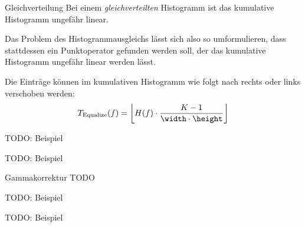 \begin{example}{Gleichverteilung}
    Bei einem \emph{gleichverteilten} Histogramm ist das kumulative Histogramm ungefähr linear.

    Das Problem des Histogrammausgleichs lässt sich also so umformulieren, dass stattdessen ein Punktoperator gefunden werden soll, der das kumulative Histogramm ungefähr linear werden lässt.

    Die Einträge können im kumulativen Histogramm wie folgt nach rechts oder links verschoben werden:
    \[
        T_{\text{Equalize}}(f) = \left\lfloor H(f) \cdot \frac{K - 1}{\width \cdot \height} \right\rfloor
    \]

    TODO: Beispiel

    TODO: Beispiel
\end{example}

\begin{defi}{Gammakorrektur}
    TODO

    TODO: Beispiel

    TODO: Beispiel
\end{defi}